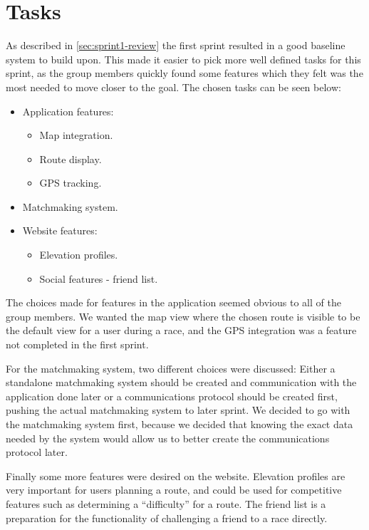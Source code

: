 \section{Tasks}
\label{sec:sprint2-tasks}

As described in \autoref{sec:sprint1-review} the first sprint resulted in a good baseline system to build upon. This made it easier to pick more well defined tasks for this sprint, as the group members quickly found some features which they felt was the most needed to move closer to the goal. The chosen tasks can be seen below:

\begin{itemize}
	\item Application features:
	\begin{itemize}
		\item Map integration.
		\item Route display.
		\item \ac{GPS} tracking.
	\end{itemize}
	\item Matchmaking system.
	\item Website features:
	\begin{itemize}
		\item Elevation profiles.
		\item Social features - friend list.
	\end{itemize}
\end{itemize}

The choices made for features in the application seemed obvious to all of the group members. We wanted the map view where the chosen route is visible to be the default view for a user during a race, and the \ac{GPS} integration was a feature not completed in the first sprint.

For the matchmaking system, two different choices were discussed: Either a standalone matchmaking system should be created and communication with the application done later or a communications protocol should be created first, pushing the actual matchmaking system to later sprint. We decided to go with the matchmaking system first, because we decided that knowing the exact data needed by the system would allow us to better create the communications protocol later.

Finally some more features were desired on the website. Elevation profiles are very important for users planning a route, and could be used for competitive features such as determining a ``difficulty'' for a route. The friend list is a preparation for the functionality of challenging a friend to a race directly.
